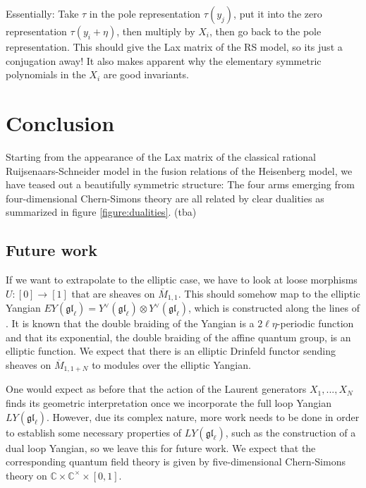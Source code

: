 \documentclass[11pt]{report}
\theoremstyle{definition}
\theoremstyle{remark}
\theoremstyle{remark}
\newcommand{\C}{\mathbb{C}}
\begin{document}
Essentially: Take $\tau$ in the pole representation $\tau(y_j)$, put it into the zero representation $\tau(y_i+\eta)$, then multiply by $X_i$, then go back to the pole representation. This should give the Lax matrix of the RS model, so its just a conjugation away! It also makes apparent why the elementary symmetric polynomials in the $X_i$ are good invariants.

\chapter{Conclusion}\label{chapter:conclusion}

Starting from the appearance of the Lax matrix of the classical rational Ruijsenaars-Schneider model in the fusion relations of the Heisenberg model, we have teased out a beautifully symmetric structure: The four arms emerging from four-dimensional Chern-Simons theory are all related by clear dualities as summarized in figure \ref{figure:dualities}. (tba)

\section*{Future work}

If we want to extrapolate to the elliptic case, we have to look at loose morphisms $U: [0] \to [1]$ that are sheaves on $\overline{M}_{1,1}$. This should somehow map to the elliptic Yangian $EY(\mathfrak{gl}_\ell) = Y^\vee(\mathfrak{gl}_\ell) \otimes Y^\vee(\mathfrak{gl}_\ell)$, which is constructed along the lines of \cite{article:brochier:2017}. It is known that the double braiding of the Yangian is a $2\ell\eta$-periodic function \cite{article:soibelman:1997} and that its exponential, the double braiding of the affine quantum group, is an elliptic function. We expect that there is an elliptic Drinfeld functor sending sheaves on $\overline{M}_{1,1+N}$ to modules over the elliptic Yangian.

One would expect as before that the action of the Laurent generators $X_1,...,X_N$ finds its geometric interpretation once we incorporate the full loop Yangian $LY(\mathfrak{gl}_\ell)$. However, due its complex nature, more work needs to be done in order to establish some necessary properties of $LY(\mathfrak{gl}_\ell)$, such as the construction of a dual loop Yangian, so we leave this for future work. We expect that the corresponding quantum field theory is given by five-dimensional Chern-Simons theory on $\C \times \C^\times \times [0,1]$.
\end{document}
